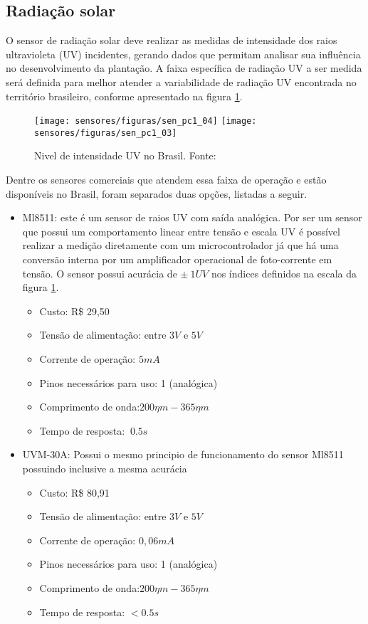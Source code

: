 	\subsection{Radiação solar}

O sensor de radiação solar deve realizar as medidas de intensidade dos raios ultravioleta (UV) incidentes, gerando dados que permitam analisar sua influência no desenvolvimento da plantação. A faixa específica de radiação UV a ser medida será definida para melhor atender a variabilidade de radiação UV encontrada no território brasileiro, conforme apresentado na figura \ref{sen_pc1_03}.
		
	\begin{figure}[H]
		\centering
		\texttt{[image: sensores/figuras/sen\_pc1\_04]}
		\texttt{[image: sensores/figuras/sen\_pc1\_03]}
		\caption{Nivel de intensidade UV no Brasil. Fonte: \cite{bib_sen_03}}
		\label{sen_pc1_03}
	\end{figure}

	Dentre os sensores comerciais que atendem essa faixa de operação e estão disponíveis no Brasil, foram separados duas opções, listadas a seguir.

		\begin{itemize}
			\item Ml8511: este é um sensor de raios UV com saída analógica. Por ser um sensor que possui um comportamento linear entre tensão e escala UV é possível realizar a medição diretamente com um microcontrolador já que há uma conversão interna por um amplificador operacional de foto-corrente em tensão. O sensor possui acurácia de $\pm~1UV$ nos índices definidos na escala da figura \ref{sen_pc1_03}.  
			\begin{itemize}
				\item Custo: R\$ 29,50 
				\item Tensão de alimentação: entre $3V$ e $5V$
				\item Corrente de operação: $5mA$
				\item Pinos necessários para uso: 1 (analógica)
				\item Comprimento de onda:$200\eta m-365\eta m$ 
				\item Tempo de resposta: $ ~0.5s$
			\end{itemize}
			\item UVM-30A: Possui o mesmo principio de funcionamento do sensor Ml8511 possuindo inclusive a mesma acurácia
			\begin{itemize}
				\item Custo: R\$ 80,91 
				\item Tensão de alimentação: entre $3V$ e $5V$
				\item Corrente de operação: $0,06mA$
				\item Pinos necessários para uso: 1 (analógica)
				\item Comprimento de onda:$200\eta m-365\eta m$ 
				\item Tempo de resposta: $ <0.5s$ 
			\end{itemize}

\end{itemize}

